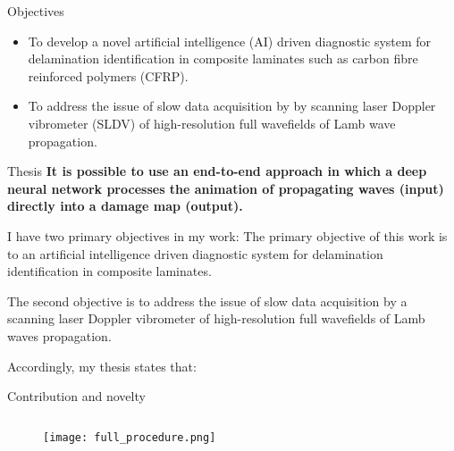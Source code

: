 \documentclass[10pt,aspectratio=169,dvipsnames]{beamer} %
\begin{document}
	\begin{frame}{Objectives}
			\justifying
			\begin{itemize}
				\item {To develop \textcolor{logoblue}{a novel artificial intelligence (AI) driven diagnostic system} for delamination identification in composite laminates such as carbon fibre reinforced polymers (CFRP).}
				\item {To address the issue of \textcolor{logoblue}{slow data acquisition} by by scanning laser Doppler vibrometer (SLDV) of high-resolution full wavefields of Lamb wave propagation.}
			\end{itemize}
		\begin{tcolorbox}			
			\begin{alertblock}{Thesis}
				\justifying
				\textbf{It is possible to use an end-to-end approach in which a deep neural network	processes the animation of propagating waves (input) directly into a damage map (output).}
			\end{alertblock}
		\end{tcolorbox}		
	\end{frame}
	\note
	{
		I have two primary objectives in my work:
		The primary objective of this work is to an artificial intelligence driven diagnostic system for delamination identification in composite laminates.
		
		The second objective is to address the issue of slow data acquisition  by a scanning laser Doppler vibrometer of high-resolution full wavefields of Lamb waves propagation.
		
		Accordingly, my thesis states that:
	}
	\begin{frame}{Contribution and novelty}
		\begin{columns}[T]
			\begin{column}[c]{0.95\textwidth}
				\begin{figure}
					\centering
					\texttt{[image: full\_procedure.png]}	
				\end{figure}		
			\end{column}
		\end{columns}		
	\end{frame}
\end{document}
